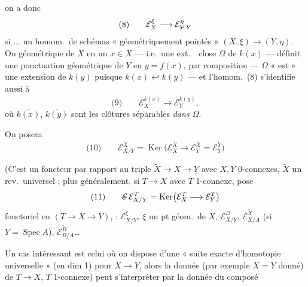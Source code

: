 \documentclass[11pt,a4paper]{article}
\begin{document}
on a donc
\[
\text{(8)} \qquad \mathcal{E}^{\xi}_{X} \longrightarrow \mathcal{E}^{\eta}_{\text{\struck{$Y$}}\,Y}
\]
si $\ldots$ un homom.\ de schémas « géométriquement
pointés » $(X, \xi) \to (Y, \eta)$. On
    géométrique
de $X$ en un $x \in X$ --- i.e.\ une
ext.\ \ close $\Omega$ de $k(x)$ ---
définit  une ponctuation géométrique
de $Y$ en $y = f(x)$, \struck{\ill{}} par composition
--- $\Omega$ « est » une extension de $k(y)$ puisque
$k(x) \hookleftarrow k(y)$ --- et l'homom.\ (8)
s'identifie aussi à
\[
\text{(9)} \qquad \mathcal{E}^{\overline{k(x)}}_{X} \longrightarrow \mathcal{E}^{\overline{k(y)}}_{Y} ,
\]
où $\overline{k(x)}$, $\overline{k(y)}$ sont les clôtures séparables
\emph{dans $\Omega$}.

On posera
\[
\text{(10)} \qquad \mathcal{E}^{\tilde{X}}_{X/Y} = \operatorname{Ker}\bigl(\mathcal{E}^{\tilde{X}}_{X} \longrightarrow \mathcal{E}^{\tilde{X}}_{Y} = \mathcal{E}^{\tilde{Y}}_{Y}\bigr)
\]

(C'est un foncteur par rapport au triple
$\tilde{X} \to X \to Y$ avec $X, Y$ 0-connexes,
$\tilde{X}$ un rev.\ universel ; plus généralement,
  si $T \to X$ avec $T$ 1-connexe,
 pose
\[
\text{(11)} \qquad \text{\struck{$\mathcal{E}$}}\,\mathcal{E}^{T}_{X/Y} = \operatorname{Ker}\bigl(\mathcal{E}^{T}_{X} \longrightarrow \mathcal{E}^{T}_{Y}\bigr)
\]
fonctoriel en
$(T \to X \to Y)$,  : $\mathcal{E}^{\xi}_{X/Y}$,
 $\xi$ un pt géom.\ de $X$, $\mathcal{E}^{\Omega}_{X/Y}$,
$\mathcal{E}^{\tilde{X}}_{X/A}$ (si $Y = \operatorname{Spec} A$), $\mathcal{E}^{\tilde{B}}_{B/A}$…

Un cas intéressant est celui où on
dispose d'une « suite exacte d'homotopie universelle »
\struck{\ill{}} (en dim 1)
pour $X \to Y$, alors la donnée
(par exemple $X = Y$ donné) de $T \to X$,
 $T$ 1-connexe) peut s'interpréter
par la donnée du composé
\end{document}
